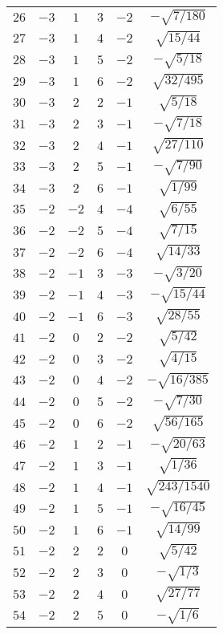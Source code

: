 \begin{table}
\begin{center}
\begin{tabular}{|c|c|c|c|c|c|}
$26$ & $-3$ & $1$ & $3$ & $-2$ & $-\sqrt{7/180}$ \\ 
$27$ & $-3$ & $1$ & $4$ & $-2$ & $\sqrt{15/44}$ \\ 
$28$ & $-3$ & $1$ & $5$ & $-2$ & $-\sqrt{5/18}$ \\ 
$29$ & $-3$ & $1$ & $6$ & $-2$ & $\sqrt{32/495}$ \\ 
$30$ & $-3$ & $2$ & $2$ & $-1$ & $\sqrt{5/18}$ \\ 
$31$ & $-3$ & $2$ & $3$ & $-1$ & $-\sqrt{7/18}$ \\ 
$32$ & $-3$ & $2$ & $4$ & $-1$ & $\sqrt{27/110}$ \\ 
$33$ & $-3$ & $2$ & $5$ & $-1$ & $-\sqrt{7/90}$ \\ 
$34$ & $-3$ & $2$ & $6$ & $-1$ & $\sqrt{1/99}$ \\ 
$35$ & $-2$ & $-2$ & $4$ & $-4$ & $\sqrt{6/55}$ \\ 
$36$ & $-2$ & $-2$ & $5$ & $-4$ & $\sqrt{7/15}$ \\ 
$37$ & $-2$ & $-2$ & $6$ & $-4$ & $\sqrt{14/33}$ \\ 
$38$ & $-2$ & $-1$ & $3$ & $-3$ & $-\sqrt{3/20}$ \\ 
$39$ & $-2$ & $-1$ & $4$ & $-3$ & $-\sqrt{15/44}$ \\ 
$40$ & $-2$ & $-1$ & $6$ & $-3$ & $\sqrt{28/55}$ \\ 
$41$ & $-2$ & $0$ & $2$ & $-2$ & $\sqrt{5/42}$ \\ 
$42$ & $-2$ & $0$ & $3$ & $-2$ & $\sqrt{4/15}$ \\ 
$43$ & $-2$ & $0$ & $4$ & $-2$ & $-\sqrt{16/385}$ \\ 
$44$ & $-2$ & $0$ & $5$ & $-2$ & $-\sqrt{7/30}$ \\ 
$45$ & $-2$ & $0$ & $6$ & $-2$ & $\sqrt{56/165}$ \\ 
$46$ & $-2$ & $1$ & $2$ & $-1$ & $-\sqrt{20/63}$ \\ 
$47$ & $-2$ & $1$ & $3$ & $-1$ & $\sqrt{1/36}$ \\ 
$48$ & $-2$ & $1$ & $4$ & $-1$ & $\sqrt{243/1540}$ \\ 
$49$ & $-2$ & $1$ & $5$ & $-1$ & $-\sqrt{16/45}$ \\ 
$50$ & $-2$ & $1$ & $6$ & $-1$ & $\sqrt{14/99}$ \\ 
$51$ & $-2$ & $2$ & $2$ & $0$ & $\sqrt{5/42}$ \\ 
$52$ & $-2$ & $2$ & $3$ & $0$ & $-\sqrt{1/3}$ \\ 
$53$ & $-2$ & $2$ & $4$ & $0$ & $\sqrt{27/77}$ \\ 
$54$ & $-2$ & $2$ & $5$ & $0$ & $-\sqrt{1/6}$ \\ 

\end{tabular}
\end{center}
\end{table}
